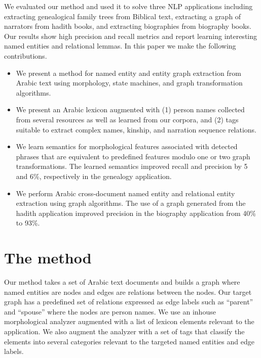 \documentclass{llncs}
\begin{document}
We evaluated our method and used it to solve three 
NLP applications including extracting genealogical family
trees from Biblical text, extracting a graph of 
narrators from hadith books, and extracting biographies from biography books.
Our results show high precision and recall metrics and report
learning interesting named entities and relational lemmas.
In this paper we make the following contributions.
\begin{itemize}
\item We present a method for named entity and entity graph
extraction from Arabic text using morphology, state 
machines, and graph transformation algorithms.
\item We present an Arabic lexicon augmented 
with (1) person names collected from several resources as well as
learned from our corpora, and (2) tags suitable to extract complex names,
kinship, and narration sequence relations. 
\item We learn semantics for morphological features associated 
with detected phrases that are equivalent to predefined features
modulo one or two graph transformations. 
The learned semantics improved recall and precision by 
5 and 6\%, respectively in the genealogy application.
\item We perform Arabic cross-document named entity and 
relational entity extraction using graph algorithms. 
The use of a graph generated from the hadith application 
improved precision in the biography application from 40\% to 93\%.
\end{itemize}

\section{The method}

Our method takes a set of Arabic text documents and builds 
a graph where named entities are nodes and edges are relations 
between the nodes. 
Our target graph has a predefined set of relations expressed 
as edge labels such as ``parent'' and ``spouse'' where the nodes
are person names.
We use an inhouse morphological analyzer augmented with 
a list of lexicon elements relevant to the application.
We also augment the analyzer with
a set of tags that classify the 
elements into several categories 
relevant to the targeted named entities and edge labels. 
\end{document}
